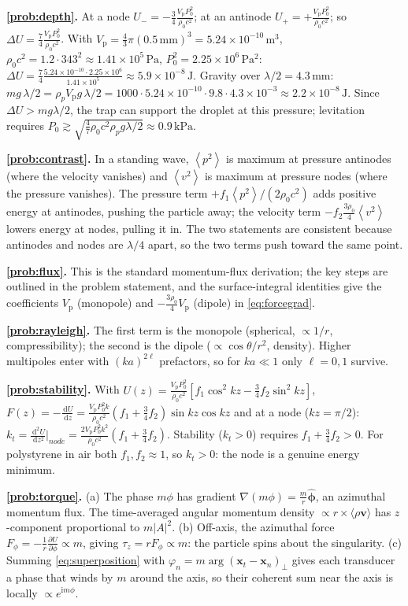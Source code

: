 \documentclass[11pt]{article}
\newcommand{\rrho}{\rho_{0}}
\newcommand{\vp}{V_{\mathrm{p}}}
\newcommand{\avg}[1]{\left\langle #1 \right\rangle}
\newcommand{\vpSq}{\avg{p^{2}}}
\newcommand{\vvSq}{\avg{v^{2}}}
\newcommand{\dd}{\,\mathrm{d}}
\newcommand{\ii}{\mathrm{i}}
\newcommand{\vv}{\mathbf{v}}
\newcommand{\xx}{\mathbf{x}}
\begin{document}
\textbf{\ref{prob:depth}.} At a node $U_-=-\frac34\frac{\vp P_0^2}{\rrho c^2}$;
at an antinode $U_+=+\frac{\vp P_0^2}{\rrho c^2}$; so
$\Delta U=\frac74\frac{\vp P_0^2}{\rrho c^2}$. With
$\vp=\frac43\pi(0.5\,\mathrm{mm})^3=5.24\times10^{-10}\,\mathrm{m^3}$,
$\rrho c^2=1.2\cdot343^2\approx1.41\times10^5\,\mathrm{Pa}$,
$P_0^2=2.25\times10^6\,\mathrm{Pa^2}$:
$\Delta U=\frac74\frac{5.24\times10^{-10}\cdot2.25\times10^6}{1.41\times10^5}\approx5.9\times10^{-8}\,\mathrm{J}$.
Gravity over $\lambda/2=4.3\,\mathrm{mm}$:
$mg\,\lambda/2=\rho_p\vp g\,\lambda/2=1000\cdot5.24\times10^{-10}\cdot9.8\cdot4.3\times10^{-3}\approx2.2\times10^{-8}\,\mathrm{J}$.
Since $\Delta U>mg\lambda/2$, the trap can support the droplet at this pressure;
levitation requires $P_0\gtrsim\sqrt{\frac47\rrho c^2\rho_p g\lambda/2}\approx0.9\,\mathrm{kPa}$.

\textbf{\ref{prob:contrast}.} In a standing wave, $\vpSq$ is maximum at pressure
antinodes (where the velocity vanishes) and $\vvSq$ is maximum at pressure nodes
(where the pressure vanishes). The pressure term $+f_1\vpSq/(2\rrho c^2)$ adds
positive energy at antinodes, pushing the particle away; the velocity term
$-f_2\frac{3\rrho}{4}\vvSq$ lowers energy at nodes, pulling it in. The two
statements are consistent because antinodes and nodes are $\lambda/4$ apart, so
the two terms push toward the same point.

\textbf{\ref{prob:flux}.} This is the standard momentum-flux derivation; the
key steps are outlined in the problem statement, and the surface-integral
identities give the coefficients $\vp$ (monopole) and $-\frac{3\rrho}{4}\vp$
(dipole) in \eqref{eq:forcegrad}.

\textbf{\ref{prob:rayleigh}.} The first term is the monopole (spherical,
$\propto1/r$, compressibility); the second is the dipole
($\propto\cos\theta/r^2$, density). Higher multipoles enter with
$(ka)^{2\ell}$ prefactors, so for $ka\ll1$ only $\ell=0,1$ survive.

\textbf{\ref{prob:stability}.} With
$U(z)=\frac{\vp P_0^2}{\rrho c^2}\left[f_1\cos^2 kz-\frac34 f_2\sin^2 kz\right]$,
$F(z)=-\frac{\dd U}{\dd z}=\frac{\vp P_0^2 k}{\rrho c^2}\left(f_1+\frac34f_2\right)\sin kz\cos kz$
and at a node ($kz=\pi/2$):
$k_t=\frac{\dd^2U}{\dd z^2}\big|_{node}=\frac{2\vp P_0^2k^2}{\rrho c^2}\left(f_1+\frac34f_2\right)$.
Stability ($k_t>0$) requires $f_1+\frac34f_2>0$. For polystyrene in air both
$f_1,f_2\approx1$, so $k_t>0$: the node is a genuine energy minimum.

\textbf{\ref{prob:torque}.} (a) The phase $m\phi$ has gradient
$\nabla(m\phi)=\frac{m}{r}\hat{\boldsymbol\phi}$, an azimuthal momentum flux.
The time-averaged angular momentum density $\propto r\times\langle\rho\vv\rangle$
has $z$-component proportional to $m|A|^2$. (b) Off-axis, the azimuthal force
$F_\phi=-\frac1r\frac{\partial U}{\partial\phi}\propto m$, giving
$\tau_z=rF_\phi\propto m$: the particle spins about the singularity.
(c) Summing \eqref{eq:superposition} with
$\varphi_n=m\arg(\xx_t-\xx_n)_\perp$ gives each transducer a phase that winds by
$m$ around the axis, so their coherent sum near the axis is locally
$\propto e^{\ii m\phi}$.
\end{document}
